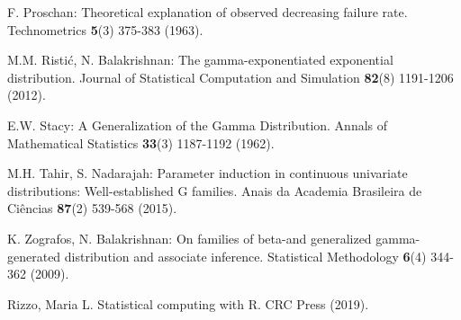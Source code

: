 \documentclass[12pt,a4paper]{article} %
\begin{document}
\begin{description}
\item
F. Proschan:
Theoretical explanation of observed decreasing failure rate.
Technometrics {\bf 5}(3) 375-383 (1963).

\item
M.M. Risti\'{c}, N. Balakrishnan:
The gamma-exponentiated exponential distribution.
Journal of Statistical Computation and Simulation {\bf 82}(8) 1191-1206 (2012).

\item
E.W. Stacy: A Generalization of the Gamma Distribution. Annals of Mathematical Statistics {\bf 33}(3) 1187-1192 (1962).

\item
M.H. Tahir, S. Nadarajah:
Parameter induction in continuous univariate distributions: Well-established G families.
Anais da Academia Brasileira de Ci\^{e}ncias {\bf 87}(2) 539-568 (2015).

\item
K. Zografos, N. Balakrishnan:
On families of beta-and generalized gamma-generated distribution and
associate inference.  Statistical Methodology {\bf 6}(4) 344-362 (2009).

\item 
Rizzo, Maria L. Statistical computing with R. CRC Press (2019).

\end{description}
\end{document}
